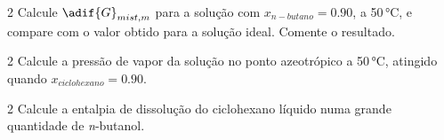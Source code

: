 \documentclass[\mainfilename]{subfiles}
\begin{document}
\begin{questionBox}2{ %
    Calcule \(\adif{G}_{mist,m}\) para a solução com \(x_{n-butano} = 0.90\), a 50\,\unit{\celsius}, e compare com o valor obtido para a solução ideal. Comente o resultado.
} %



\end{questionBox}

\begin{questionBox}2{ %
    Calcule a pressão de vapor da solução no ponto azeotrópico a 50\,\unit{\celsius}, atingido quando \(x_{ciclohexano}=0.90\).
} %
    

\end{questionBox}

\begin{questionBox}2{ %
    Calcule a entalpia de dissolução do ciclohexano líquido numa grande quantidade de \textit{n}-butanol.
} %

\end{questionBox}
\end{document}
